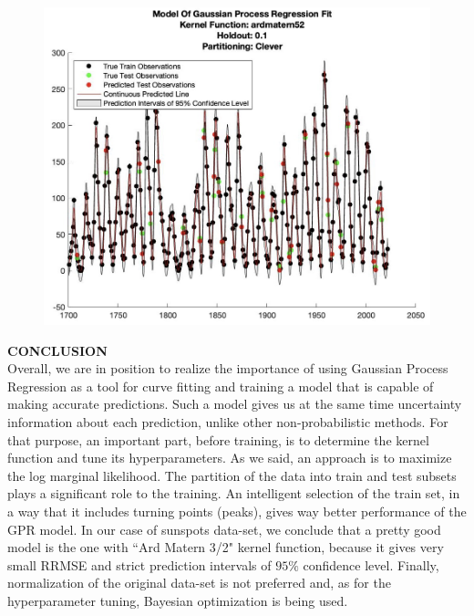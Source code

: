 \documentclass[12pt,a4paper]{article}
\newcommand{\boldmark}[1]{\noindent\textbf{#1}\\ }
\begin{document}
\begin{figure}[H]
	\centering
	\includegraphics[scale = 0.5]{Ard_Matern52.jpg}
\end{figure}

\newpage

\sectionmark{}
\noindent
\boldmark{\Large{{\color{crimsonglory}CONCLUSION}}}

\normalsize
\noindent
Overall, we are in position to realize the importance of using Gaussian Process Regression as a tool for curve fitting and training a model that is capable of making accurate predictions. Such a model gives us at the same time uncertainty information about each prediction, unlike other non-probabilistic methods. For that purpose, an important part, before training, is to determine the kernel function and tune its hyperparameters. As we said, an approach is to maximize the log marginal likelihood. The partition of the data into train and test subsets plays a significant role to the training. An intelligent selection of the train set, in a way that it includes turning points (peaks), gives way better performance of the GPR model. In our case of sunspots data-set, we conclude that a pretty good model is the one with ``Ard Matern 3/2" kernel function, because it gives very small RRMSE and strict prediction intervals of $95\%$ confidence level. Finally, normalization of the original data-set is not preferred and, as for the hyperparameter tuning, Bayesian optimization is being used.

\end{document}
